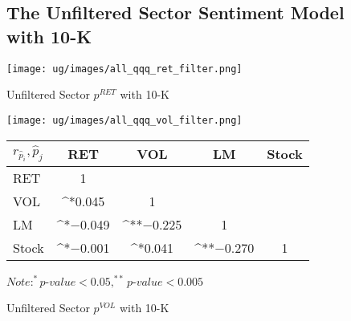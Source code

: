 \documentclass[logo,bsc,singlespacing,parskip]{infthesis}
\begin{document}
\begin{figure}[ht]
\subsection{The Unfiltered Sector Sentiment Model with 10-K}
\label{appendix_all_qqq}
  \centering
\begin{minipage}{0.5\textwidth}
    \centering
    \texttt{[image: ug/images/all\_qqq\_ret\_filter.png]}
    \caption{\small Unfiltered Sector ${p}^{RET}$ with 10-K}
    \label{fig:all_qqq_ret_filter}
  \end{minipage}%
  \begin{minipage}{0.5\textwidth}
    \centering
    \texttt{[image: ug/images/all\_qqq\_vol\_filter.png]} 
    \caption{\small Unfiltered Sector ${p}^{VOL}$ with 10-K}
    \label{fig:all_qqq_vol_filter}
  \end{minipage}

    \begin{minipage}[p]{1.0\textwidth}
    \centering    
    \begin{tabular}{lcccc}
    \label{tab:all_qqq_corr1}
    $r_\hat{p}_i,\hat{p}_j$       & RET       & VOL       & LM        & Stock    \\ \hline
    RET    & 1  &   &  &  \\
    VOL    & ^{*}0.045  &  1  &  &   \\
    LM    & ^{*}$-$0.049 & ^{**}$-$0.225 & 1  &  \\
    Stock  & ^{*}$-$0.001 & ^{*}0.041  & ^{**}$-$0.270 & 1  \\ \hline
    \end{tabular}
    \medskip
    $\textit{Note}: ^{*}p$-$value<0.05, ^{**}p$-$value<0.005$
    
    \end{minipage}%


\end{figure}
\end{document}
